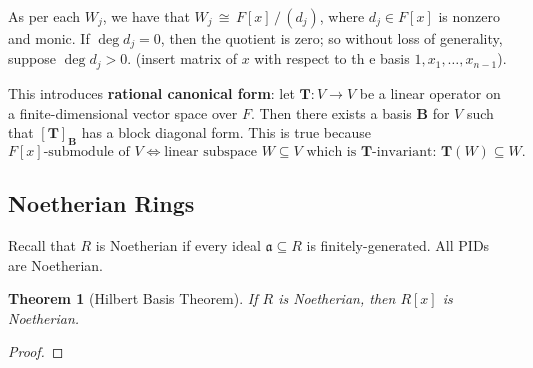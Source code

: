 \documentclass[11pt]{article}
\newtheorem{theorem}{Theorem}
\newcommand{\mat}[1]{\mathbf{#1}}
\begin{document}
As per each $W_{j}$, we have that $W_{j} \, \cong \, F[x] \, / \, (d_{j})$, where $d_{j} \in F[x]$ is nonzero and monic. If $\deg d_{j} = 0$, then the quotient is zero; so without loss of generality, suppose $\deg d_{j} > 0$. (insert matrix of $x$ with respect to th e basis $1, x_{1}, \ldots, x_{n - 1}$).

This introduces \textbf{rational canonical form}: let $\mat{T} : V \to V$ be a linear operator on a finite-dimensional vector space over $F$. Then there exists a basis $\mat{B}$ for $V$ such that $[ \mat{T} ]_{\mat{B}}$ has a block diagonal form. This is true because
\[
  \text{$F[x]$-submodule of $V$} \iff \text{linear subspace $W \subseteq V$ which is $\mat{T}$-invariant: $\mat{T}(W) \subseteq W$}.
\]

\subsection{Noetherian Rings}

Recall that $R$ is Noetherian if every ideal $\mathfrak{a} \subseteq R$ is finitely-generated. All PIDs are Noetherian.

\begin{adjustwidth}{0.5cm}{}
  \begin{theorem}[Hilbert Basis Theorem]
    If $R$ is Noetherian, then $R[x]$ is Noetherian.
  \end{theorem}
  \begin{proof}
    
  \end{proof}
\end{adjustwidth}

\end{document}
